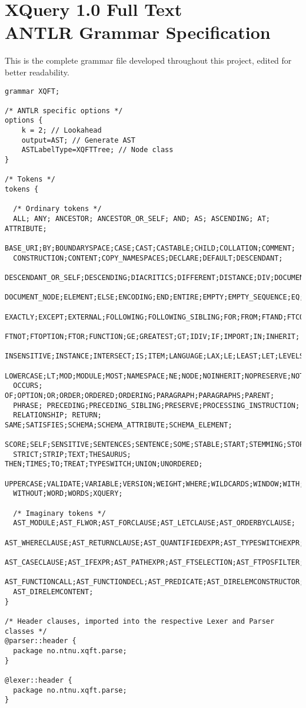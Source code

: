 \chapter[XQFT ANTLR Grammar Specification]{XQuery 1.0 Full Text \\ ANTLR Grammar Specification}
This is the complete grammar file developed throughout this project, edited for
better readability.

\begin{Verbatim}[frame=none, fontsize=\footnotesize]
grammar XQFT;

/* ANTLR specific options */
options { 
    k = 2; // Lookahead
    output=AST; // Generate AST
    ASTLabelType=XQFTTree; // Node class
}

/* Tokens */
tokens {

  /* Ordinary tokens */
  ALL; ANY; ANCESTOR; ANCESTOR_OR_SELF; AND; AS; ASCENDING; AT; ATTRIBUTE; 
  BASE_URI;BY;BOUNDARYSPACE;CASE;CAST;CASTABLE;CHILD;COLLATION;COMMENT;
  CONSTRUCTION;CONTENT;COPY_NAMESPACES;DECLARE;DEFAULT;DESCENDANT;
  DESCENDANT_OR_SELF;DESCENDING;DIACRITICS;DIFFERENT;DISTANCE;DIV;DOCUMENT;
  DOCUMENT_NODE;ELEMENT;ELSE;ENCODING;END;ENTIRE;EMPTY;EMPTY_SEQUENCE;EQ;EVERY;
  EXACTLY;EXCEPT;EXTERNAL;FOLLOWING;FOLLOWING_SIBLING;FOR;FROM;FTAND;FTCONTAINS;
  FTNOT;FTOPTION;FTOR;FUNCTION;GE;GREATEST;GT;IDIV;IF;IMPORT;IN;INHERIT;
  INSENSITIVE;INSTANCE;INTERSECT;IS;ITEM;LANGUAGE;LAX;LE;LEAST;LET;LEVELS;
  LOWERCASE;LT;MOD;MODULE;MOST;NAMESPACE;NE;NODE;NOINHERIT;NOPRESERVE;NOT;
  OCCURS; OF;OPTION;OR;ORDER;ORDERED;ORDERING;PARAGRAPH;PARAGRAPHS;PARENT;
  PHRASE; PRECEDING;PRECEDING_SIBLING;PRESERVE;PROCESSING_INSTRUCTION;
  RELATIONSHIP; RETURN; SAME;SATISFIES;SCHEMA;SCHEMA_ATTRIBUTE;SCHEMA_ELEMENT;
  SCORE;SELF;SENSITIVE;SENTENCES;SENTENCE;SOME;STABLE;START;STEMMING;STOP;
  STRICT;STRIP;TEXT;THESAURUS; THEN;TIMES;TO;TREAT;TYPESWITCH;UNION;UNORDERED;
  UPPERCASE;VALIDATE;VARIABLE;VERSION;WEIGHT;WHERE;WILDCARDS;WINDOW;WITH;
  WITHOUT;WORD;WORDS;XQUERY;

  /* Imaginary tokens */
  AST_MODULE;AST_FLWOR;AST_FORCLAUSE;AST_LETCLAUSE;AST_ORDERBYCLAUSE;
  AST_WHERECLAUSE;AST_RETURNCLAUSE;AST_QUANTIFIEDEXPR;AST_TYPESWITCHEXPR;
  AST_CASECLAUSE;AST_IFEXPR;AST_PATHEXPR;AST_FTSELECTION;AST_FTPOSFILTER;
  AST_FUNCTIONCALL;AST_FUNCTIONDECL;AST_PREDICATE;AST_DIRELEMCONSTRUCTOR;
  AST_DIRELEMCONTENT;
}

/* Header clauses, imported into the respective Lexer and Parser classes */
@parser::header {
  package no.ntnu.xqft.parse;
}

@lexer::header {
  package no.ntnu.xqft.parse;  
}


\end{Verbatim}
